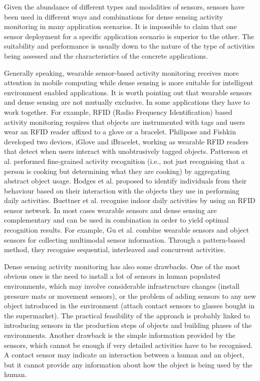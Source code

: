 Given the abundance of different types and modalities of sensors, sensors have been used in different ways and combinations for dense sensing activity monitoring in many application scenarios. It is impossible to claim that one sensor deployment for a specific application scenario is superior to the other. The suitability and performance is usually down to the nature of the type of activities being assessed and the characteristics of the concrete applications. 

Generally speaking, wearable sensor-based activity monitoring receives more attention in mobile computing while dense sensing is more suitable for intelligent environment enabled applications. It is worth pointing out that wearable sensors and dense sensing are not mutually exclusive. In some applications they have to work together. For example, RFID (Radio Frequency Identification) based activity monitoring requires that objects are instrumented with tags and users wear an RFID reader affixed to a glove or a bracelet. Philipose and Fishkin \cite{Philipose2004} \cite{Fishkin2005} developed two devices, iGlove and iBracelet, working as wearable RFID readers that detect when users interact with unobtrusively tagged objects. Patterson et al. \cite{Patterson2005} performed fine-grained activity recognition (i.e., not just recognising that a person is cooking but determining what they are cooking) by aggregating abstract object usage. Hodges et al. \cite{Hodges2007} proposed to identify individuals from their behaviour based on their interaction with the objects they use in performing daily activities. Buettner et al. \cite{Buettner2009} recognise indoor daily activities by using an RFID sensor network. In most cases wearable sensors and dense sensing are complementary and can be used in combination in order to yield optimal recognition results. For example, Gu et al. \cite{Gu2009} combine wearable sensors and object sensors for collecting multimodal sensor information. Through a pattern-based method, they recognise sequential, interleaved and concurrent activities.

Dense sensing activity monitoring has also some drawbacks. One of the most obvious ones is the need to install a lot of sensors in human populated environments, which may involve considerable infrastructure changes (install pressure mats or movement sensors), or the problem of adding sensors to any new object introduced in the environment (attach contact sensors to glasses bought in the supermarket). The practical feasibility of the approach is probably linked to introducing sensors in the production steps of objects and building phases of the environments. Another drawback is the simple information provided by the sensors, which cannot be enough if very detailed activities have to be recognised. A contact sensor may indicate an interaction between a human and an object, but it cannot provide any information about how the object is being used by the human. 